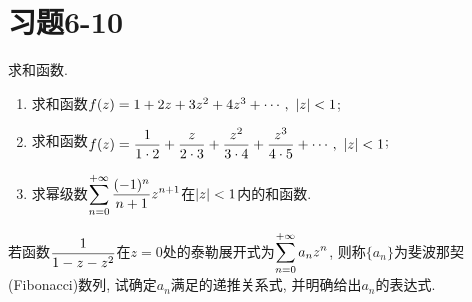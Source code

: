 \section{习题6-10}

\begin{yyEx}
	求和函数.\begin{enumerate}
		\item 求和函数$f(z) = 1+2z+3z^2+4z^3+\cdots,~\lvert z\rvert<1$;
		\item 求和函数$\begin{lgathered}
			f(z) = \frac{1}{1\cdot 2}+\frac{z}{2\cdot 3}+\frac{z^2}{3\cdot 4}+\frac{z^3}{4\cdot 5}+\cdots,~\abs{z}<1
		\end{lgathered}$;
		\item 求幂级数$\begin{lgathered}
			\sum_{n = 0}^{+\infty}\frac{(-1)^n}{n+1}z^{n+1}
		\end{lgathered}$在$\lvert z\rvert<1$内的和函数.
	\end{enumerate}
\end{yyEx}

\begin{yyEx}
	若函数$\begin{lgathered}
		\frac{1}{1-z-z^2}
	\end{lgathered}$在$z = 0$处的泰勒展开式为$\begin{lgathered}
		\sum_{n = 0}^{+\infty}a_nz^n
	\end{lgathered}$, 则称$\{a_n\}$为斐波那契(Fibonacci)数列, 试确定$a_n$满足的递推关系式, 并明确给出$a_n$的表达式.
\end{yyEx}

